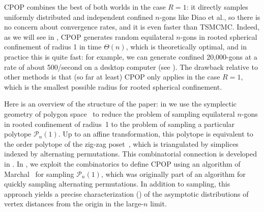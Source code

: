 \documentclass{article}
\theoremstyle{definition}
\begin{document}
CPOP combines the best of both worlds in the case $R=1$: it directly samples uniformly distributed and independent confined $n$-gons like Diao et al., so there is no concern about convergence rates, and it is even faster than TSMCMC. Indeed, as we will see in , CPOP generates random equilateral $n$-gons in rooted spherical confinement of radius 1 in time $\Theta(n)$, which is theoretically optimal, and in practice this is quite fast: for example, we can generate confined 20,000-gons at a rate of about 500/second on a desktop computer (see ). The drawback relative to other methods is that (so far at least) CPOP only applies in the case $R=1$, which is the smallest possible radius for rooted spherical confinement. 

Here is an overview of the structure of the paper: in  we use the symplectic geometry of polygon space~\cite{kapovichSymplecticGeometryPolygons1996} to reduce the problem of sampling equilateral $n$-gons in rooted confinement of radius~1 to the problem of sampling a particular polytope $\mathcal{P}_n(1)$. Up to an affine transformation, this polytope is equivalent to the order polytope of the zig-zag poset~\cite{stanleyTwoPosetPolytopes1986}, which is triangulated by simplices indexed by alternating permutations. This combinatorial connection is developed in . In , we exploit the combinatorics to define CPOP using an algorithm of Marchal~\cite{marchalGeneratingRandomAlternating2012} for sampling $\mathcal{P}_n(1)$, which was originally part of an algorithm for quickly sampling alternating permutations. In addition to sampling, this approach yields a precise characterization () of the asymptotic distributions of vertex distances from the origin in the large-$n$ limit.
\end{document}
